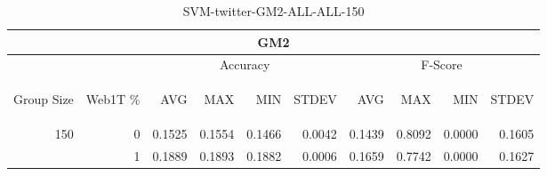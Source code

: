 \begin{center}
\begin{table}[htbp] 
 \begin{center}
\begin{tabular}{ | r | r | r | r | r | r | r | r | r | r |}
\hline
\multicolumn{10}{|c|}{GM2}\\
\hline
 & & \multicolumn{4}{|c|}{Accuracy} & \multicolumn{4}{|c|}{F-Score}\\ \cline{3-10}
\begin{sideways}Group Size\end{sideways} & \begin{sideways}Web1T \%\end{sideways} & \begin{sideways}AVG\end{sideways} & \begin{sideways}MAX\end{sideways} & \begin{sideways}MIN\end{sideways} & \begin{sideways}STDEV\end{sideways} & \begin{sideways}AVG\end{sideways} & \begin{sideways}MAX\end{sideways} & \begin{sideways}MIN\end{sideways} & \begin{sideways}STDEV\end{sideways}\\
\hline
\multirow{1}{*}{150}
 & 0 & 0.1525 & 0.1554 & 0.1466 & 0.0042 & 0.1439 & 0.8092 & 0.0000 & 0.1605\\ \cline{2-10}
 & 1 & 0.1889 & 0.1893 & 0.1882 & 0.0006 & 0.1659 & 0.7742 & 0.0000 & 0.1627\\ \cline{2-10}
\hline
\end{tabular}
\caption{SVM-twitter-GM2-ALL-ALL-150}
\label{table:SVM-twitter-GM2-ALL-ALL-150}
\end{center}
 \end{table}
\end{center}


